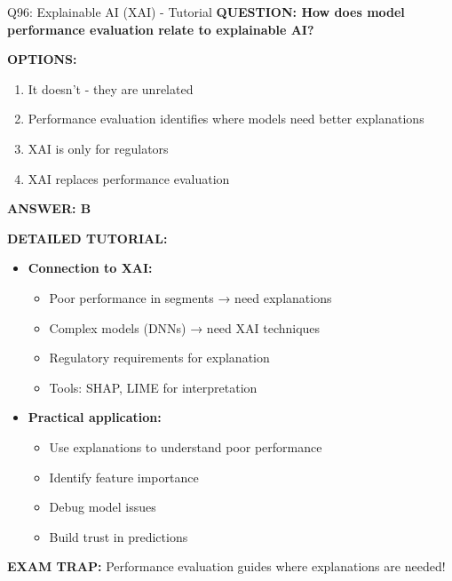 \documentclass[8pt]{beamer}
\begin{document}
\begin{frame}{Q96: Explainable AI (XAI) - Tutorial}
	\fontsize{6.5}{7.5}\selectfont
	\textbf{QUESTION: How does model performance evaluation relate to explainable AI?}
	
	\vspace{0.1cm}
	\textbf{OPTIONS:}
	\begin{enumerate}
		\item It doesn't - they are unrelated
		\item Performance evaluation identifies where models need better explanations
		\item XAI is only for regulators
		\item XAI replaces performance evaluation
	\end{enumerate}
	
	\vspace{0.1cm}
	\textcolor{myblue}{\textbf{ANSWER: B}}
	
	\vspace{0.1cm}
	\textbf{DETAILED TUTORIAL:}
	\begin{itemize}
		\item \textbf{Connection to XAI:}
		\begin{itemize}
			\item Poor performance in segments → need explanations
			\item Complex models (DNNs) → need XAI techniques
			\item Regulatory requirements for explanation
			\item Tools: SHAP, LIME for interpretation
		\end{itemize}
		\item \textbf{Practical application:}
		\begin{itemize}
			\item Use explanations to understand poor performance
			\item Identify feature importance
			\item Debug model issues
			\item Build trust in predictions
		\end{itemize}
	\end{itemize}
	
	\textcolor{myred}{\textbf{EXAM TRAP:}} Performance evaluation guides \textcolor{myblue}{where explanations are needed}!
\end{frame}
\end{document}
